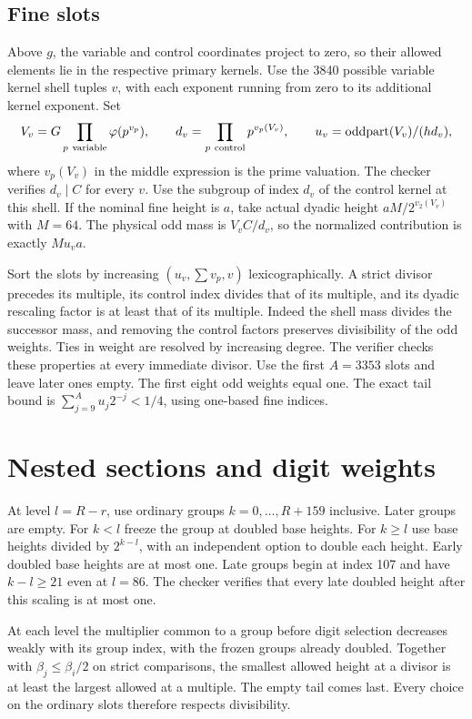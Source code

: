 \documentclass[11pt]{article}
\numberwithin{equation}{section}
\theoremstyle{definition}
\theoremstyle{remark}
\begin{document}
\subsection{Fine slots}\label{fine-slots}

Above \(g\), the variable and control coordinates project to zero, so their allowed elements lie in the respective primary kernels. Use the 3840 possible variable kernel shell tuples \(v\), with each exponent running from zero to its additional kernel exponent. Set \[
 V_v=G\prod_{p\ {\rm variable}}\varphi(p^{v_p}),\qquad
 d_v=\prod_{p\ {\rm control}}p^{v_p(V_v)},\qquad
 u_v=\operatorname{oddpart}(V_v)/(h d_v),
\] where \(v_p(V_v)\) in the middle expression is the prime valuation. The checker verifies \(d_v\mid C\) for every \(v\). Use the subgroup of index \(d_v\) of the control kernel at this shell. If the nominal fine height is \(a\), take actual dyadic height \(aM/2^{v_2(V_v)}\) with \(M=64\). The physical odd mass is \(V_vC/d_v\), so the normalized contribution is exactly \(M u_v a\).

Sort the slots by increasing \((u_v,\sum v_p,v)\) lexicographically. A strict divisor precedes its multiple, its control index divides that of its multiple, and its dyadic rescaling factor is at least that of its multiple. Indeed the shell mass divides the successor mass, and removing the control factors preserves divisibility of the odd weights. Ties in weight are resolved by increasing degree. The verifier checks these properties at every immediate divisor. Use the first \(A=3353\) slots and leave later ones empty. The first eight odd weights equal one. The exact tail bound is \(\sum_{j=9}^A u_j2^{-j}<1/4\), using one-based fine indices.

\section{Nested sections and digit weights}\label{h100:nesting}

At level \(l=R-r\), use ordinary groups \(k=0,\ldots,R+159\) inclusive. Later groups are empty. For \(k<l\) freeze the group at doubled base heights. For \(k\ge l\) use base heights divided by \(2^{k-l}\), with an independent option to double each height. Early doubled base heights are at most one. Late groups begin at index 107 and have \(k-l\ge21\) even at \(l=86\). The checker verifies that every late doubled height after this scaling is at most one.

At each level the multiplier common to a group before digit selection decreases weakly with its group index, with the frozen groups already doubled. Together with \(\beta_j\le\beta_i/2\) on strict comparisons, the smallest allowed height at a divisor is at least the largest allowed at a multiple. The empty tail comes last. Every choice on the ordinary slots therefore respects divisibility.
\end{document}
